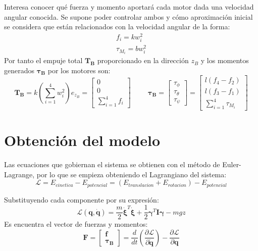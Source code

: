 \documentclass[twoside,11pt]{book}
\begin{document}
Interesa conocer qué fuerza y momento aportará cada motor dada una velocidad angular conocida. Se supone poder controlar ambos y cómo aproximación inicial se considera que están relacionados con la velocidad angular de la forma:
\begin{equation}
\begin{array}{l}
f_i=kw^2_i \\ 
\tau_{M_i}=bw^2_i
\end{array}
\end{equation}
Por tanto el empuje total $\pmb{T_B}$ proporcionado en la dirección $z_B$ y los momentos generados $\pmb{\tau_B}$ por los motores son:
\begin{equation}
\pmb{T_B}=k\left(\sum_{i=1}^{4}w^2_i \right)e_{z_B}=\left[ \begin{array}{c}
0 \\
0 \\
\displaystyle\sum_{i=1}^{4}f_i
\end{array} \right] 
\hspace{1cm} \pmb{\tau_B}=\left[ \begin{array}{c}
\tau_\phi \\
\tau_\theta \\
\tau_\psi
\end{array} \right] = \left[ \begin{array}{c}
l(f_4 - f_2) \\
l(f_3 - f_1) \\
\displaystyle\sum_{i=1}^{4}\tau_{M_i}
\end{array} \right]
\end{equation}

\section{Obtención del modelo}
Las ecuaciones que gobiernan el sistema se obtienen con el método de Euler-Lagrange, por lo que se empieza obteniendo el Lagrangiano del sistema:
\begin{equation}
\mathcal{L}=E_{cinetica} - E_{potencial} = (E_{translacion}+E_{rotacion})-E_{potencial}
\end{equation}

Substituyendo cada componente por su expresión:
\begin{equation}
\mathcal{L}(\pmb{q},\pmb{\dot{q}})=\frac{m}{2} \pmb{\dot{\xi}}^T \pmb{\dot{\xi}} + \frac{1}{2}\pmb{\gamma}^{T}\pmb{I}\pmb{\gamma} - mgz
\end{equation}
Es encuentra el vector de fuerzas y  momentos:
\begin{equation}
\pmb{F}=\left[ \begin{array}{c}
\pmb{f} \\
\pmb{\tau_B}
\end{array} \right] = \frac{d}{dt}\left(\frac{\partial \mathcal{L}}{\partial \pmb{\dot{q}}}\right)-\frac{\partial\mathcal{L}}{\partial \pmb{q}}
\end{equation}
\end{document}
